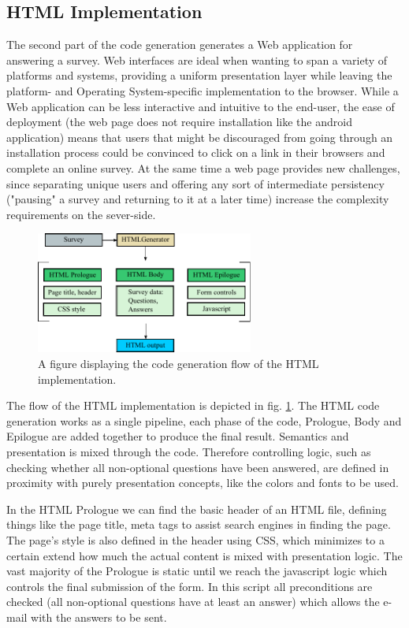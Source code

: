 \documentclass[runningheads]{llncs}
\begin{document}
\subsection {HTML Implementation}
The second part of the code generation generates a Web application for answering a survey. Web interfaces are ideal when wanting to span a variety of platforms and systems, providing a uniform presentation layer while leaving the platform- and Operating System-specific implementation to the browser. While a Web application can be less interactive and intuitive to the end-user, the ease of deployment (the web page does not require installation like the android application) means that users that might be discouraged from going through an installation process could be convinced to click on a link in their browsers and complete an online survey. At the same time a web page provides new challenges, since separating unique users and offering any sort of intermediate persistency ("pausing" a survey and returning to it at a later time) increase the complexity requirements on the sever-side. 
\begin{figure}
\centering
\includegraphics[height=4cm]{htmlgen}
\caption{A figure displaying the code generation flow of the HTML implementation.}
\label{fig:htmlgen}
\end{figure}
The flow of the HTML implementation is depicted in fig. \ref{fig:htmlgen}. The HTML code generation works as a single pipeline, each phase of the code, Prologue, Body and Epilogue are added together to produce the final result. Semantics and presentation is mixed through the code. Therefore controlling logic, such as  checking whether all non-optional questions have been answered, are defined in proximity with purely presentation concepts, like the colors and fonts to be used. 

In the HTML Prologue we can find the basic header of an HTML file, defining things like the page title, meta tags to assist search engines in finding the page. The page's style is also defined in the header using CSS, which minimizes to a certain extend how much the actual content is mixed with presentation logic. The vast majority of the Prologue is static until we reach the javascript logic which controls the final submission of the form. In this script all preconditions are checked (all non-optional questions have at least an answer) which allows the e-mail with the answers to be sent. 
\end{document}

